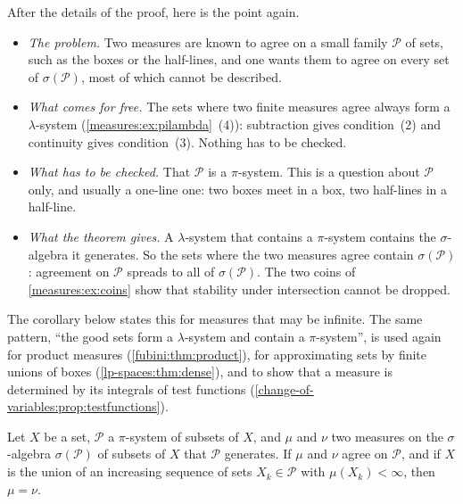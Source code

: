 \begin{notechapter}
\begin{keyidea}
After the details of the proof, here is the point again.
\begin{itemize}[nosep]
  \item \emph{The problem.} Two measures are known to agree on a small
        family $\mathcal P$ of sets, such as the boxes or the half-lines,
        and one wants them to agree on every set of $\sigma(\mathcal P)$,
        most of which cannot be described.
  \item \emph{What comes for free.} The sets where two finite measures
        agree always form a $\lambda$-system
        (\cref{measures:ex:pilambda}~(4)): subtraction gives
        condition~(2) and continuity gives condition~(3). Nothing has to
        be checked.
  \item \emph{What has to be checked.} That $\mathcal P$ is a
        $\pi$-system. This is a question about $\mathcal P$ only, and
        usually a one-line one: two boxes meet in a box, two half-lines
        in a half-line.
  \item \emph{What the theorem gives.} A $\lambda$-system that contains
        a $\pi$-system contains the $\sigma$-algebra it generates. So the
        sets where the two measures agree contain $\sigma(\mathcal P)$:
        agreement on $\mathcal P$ spreads to all of $\sigma(\mathcal P)$.
        The two coins of \cref{measures:ex:coins} show that stability
        under intersection cannot be dropped.
\end{itemize}
The corollary below states this for measures that may be infinite. The
same pattern, ``the good sets form a $\lambda$-system and contain a
$\pi$-system'', is used again for product measures
(\cref{fubini:thm:product}), for approximating sets by finite unions of
boxes (\cref{lp-spaces:thm:dense}), and to show that a measure is
determined by its integrals of test functions
(\cref{change-of-variables:prop:testfunctions}).
\end{keyidea}

\begin{corollary}\label{measures:cor:uniqueness}
Let $X$ be a set, $\mathcal P$ a $\pi$-system of subsets of $X$, and
$\mu$ and $\nu$ two measures on the $\sigma$-algebra $\sigma(\mathcal P)$
of subsets of $X$ that $\mathcal P$ generates. If $\mu$ and $\nu$ agree
on $\mathcal P$, and if $X$ is the union of an increasing sequence of
sets $X_k\in\mathcal P$ with $\mu(X_k) < \infty$, then $\mu = \nu$.
\end{corollary}


\end{notechapter}
